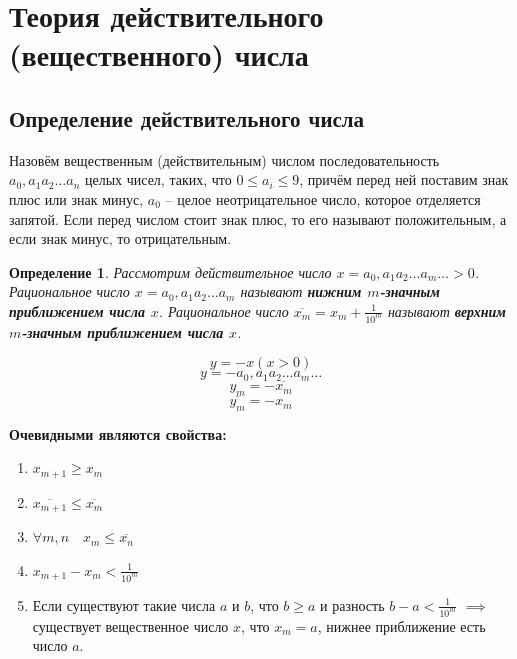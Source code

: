 \documentclass[a4paper,oneside]{article}
\newtheorem{definition}{Определение}[subsection]
\begin{document}
\section{Теория действительного (вещественного) числа}

\subsection{Определение действительного числа}

Назовём вещественным (действительным) числом последовательность
$a_0,a_1 a_2 \dots a_n$ целых чисел, таких, что $0 \le a_i \le 9$,
причём перед ней поставим знак плюс или знак минус,
$a_0$ -- целое неотрицательное число, которое отделяется запятой.
Если перед числом стоит знак плюс, то его называют положительным,
а если знак минус, то отрицательным.

\begin{definition}
    Рассмотрим действительное число $x = a_0,a_1 a_2 \dots a_m \dots > 0$.
    Рациональное число $x = a_0,a_1 a_2 \dots a_m$ называют
    \textbf{нижним $m$-значным приближением числа $x$}.
    Рациональное число $\overline{x_m} = x_m + \frac{1}{10^m}$ называют
    \textbf{верхним $m$-значным приближением числа $x$}.
\end{definition}

\[y = -x (x > 0)\]
\[y = -a_0,a_1 a_2 \dots a_m \dots\]
\[y_m = -\overline{x_m}\]
\[\overline{y_m} = -x_m\]

\textbf{Очевидными являются свойства:}
\begin{enumerate}
    \item $x_{m+1} \ge x_m$
    \item $\overline{x_{m+1}} \le \overline{x_m}$
    \item $\forall m,n \quad x_m \le \overline{x_n}$
    \item $x_{m+1} - x_m < \frac{1}{10^m}$
    \item Если существуют такие числа $a$ и $b$, что $b \ge a$
    и разность $b - a < \frac{1}{10^m}$ $\implies$ существует
    вещественное число $x$, что $x_m = a$, нижнее приближение есть число $a$.
\end{enumerate}
\end{document}
